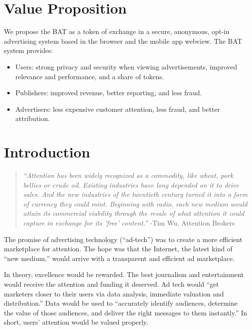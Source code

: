 \documentclass[11pt]{article}
\begin{document}
\tableofcontents
\pagebreak

\section{Value Proposition}
\label{sec-2}

We propose the BAT as a token of exchange in a secure, anonymous, opt-in advertising system based in the browser and the mobile app webview. The BAT system provides: 
\begin{itemize}
\item{Users: strong privacy and security when viewing advertisements, improved relevance and performance, and a share of tokens. }
\item{Publishers: improved  revenue, better reporting, and less fraud. }
\item{Advertisers: less expensive customer attention, less fraud, and better attribution.}
\end{itemize}
\section{Introduction}
\label{sec-3}

\begin{quote}\textit{``Attention has been widely recognized as a commodity, like wheat, pork bellies or crude oil. Existing industries have long depended on it to drive sales. And the new industries of the twentieth century turned it into a form of currency they could mint. Beginning with radio, each new medium would attain its commercial viability through the resale of what attention it could capture in exchange for its 'free' content.''} -Tim Wu, Attention Brokers \end{quote} 

The promise of advertising technology (``ad-tech'') was to create a more efficient marketplace for attention. The hope was that the Internet, the latest kind of ``new medium,'' would arrive with a transparent and efficient ad marketplace. 

In theory, excellence would be rewarded. The best journalism and entertainment would receive the attention and funding it deserved. Ad tech would ``get marketers closer to their users via data analysis, immediate valuation and distribution.'' Data would be used to ``accurately identify audiences, determine the value of those audiences, and deliver the right messages to them instantly.''\cite{1} In short, users' attention would be valued properly. 
\end{document}

